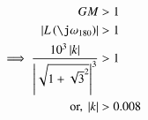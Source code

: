 \begin{enumerate}[label=\arabic*.,ref=\theenumi]
\begin{align}
GM &> 1
\\
\abs{L\brak{\j\omega_{180}}} & >  1 \\
 \implies     \frac{10^3\abs{k}}{{\abs{\sqrt{1+{\sqrt{3}}^2}}}^3} &> 1\\
\text{or, }     \abs{k}  &>  0.008
\end{align}

\end{enumerate}
